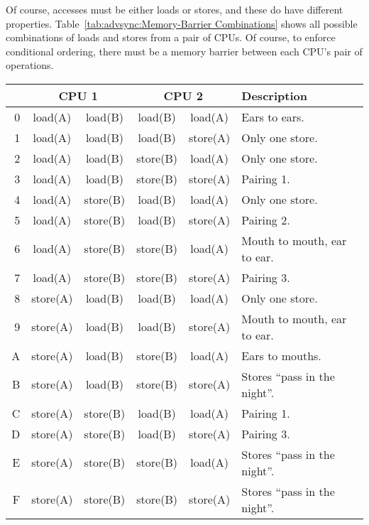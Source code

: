 Of course, accesses must be either loads or stores, and these
do have different properties.
Table~\ref{tab:advsync:Memory-Barrier Combinations}
shows all possible combinations of loads and stores from a pair
of CPUs.
Of course, to enforce conditional ordering, there must be
a memory barrier between each CPU's pair of operations.

\begin{table*}
\small
\centering
\begin{tabular}{r||c|c||c|c||l}
	\multicolumn{1}{c||}{} & \multicolumn{2}{c||}{CPU 1} &
		\multicolumn{2}{c||}{CPU 2} & Description \\
	\hline
	\hline
	0 & load(A) & load(B) & load(B) & load(A) &
		Ears to ears. \\
	1 & load(A) & load(B) & load(B) & store(A) &
		Only one store. \\
	2 & load(A) & load(B) & store(B) & load(A) &
		Only one store. \\
	3 & load(A) & load(B) & store(B) & store(A) &
		Pairing 1. \\
	\hline
	4 & load(A) & store(B) & load(B) & load(A) &
		Only one store. \\
	5 & load(A) & store(B) & load(B) & store(A) &
		Pairing 2. \\
	6 & load(A) & store(B) & store(B) & load(A) &
		Mouth to mouth, ear to ear. \\
	7 & load(A) & store(B) & store(B) & store(A) &
		Pairing 3. \\
	\hline
	8 & store(A) & load(B) & load(B) & load(A) &
		Only one store. \\
	9 & store(A) & load(B) & load(B) & store(A) &
		Mouth to mouth, ear to ear. \\
	A & store(A) & load(B) & store(B) & load(A) &
		Ears to mouths. \\
	B & store(A) & load(B) & store(B) & store(A) &
		Stores ``pass in the night''. \\
	\hline
	C & store(A) & store(B) & load(B) & load(A) &
		Pairing 1. \\
	D & store(A) & store(B) & load(B) & store(A) &
		Pairing 3. \\
	E & store(A) & store(B) & store(B) & load(A) &
		Stores ``pass in the night''. \\
	F & store(A) & store(B) & store(B) & store(A) &
		Stores ``pass in the night''. \\
\end{tabular}
\caption{Memory-Barrier Combinations}
\label{tab:advsync:Memory-Barrier Combinations}
\end{table*}

